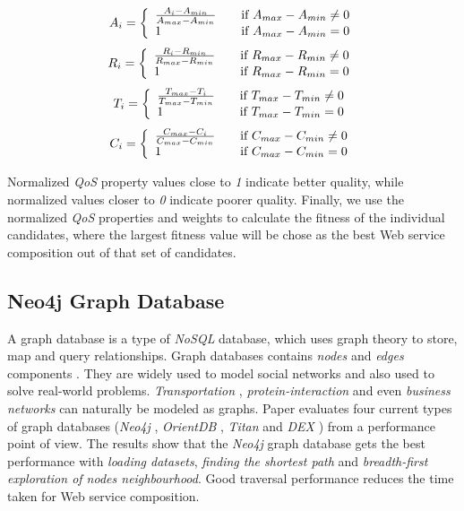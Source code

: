 \[A_i = \left\{
\begin{array}{l l} 
    \frac{A_i - A_{min}}{A_{max} - A_{min}}      & \quad \text{if  } A_{max} - A_{min} \neq 0\\
    1  & \quad \text{if  } A_{max} - A_{min} = 0\\
\end{array} \right. \]\label{eq:2}
\[R_i = \left\{
\begin{array}{l l} 
    \frac{R_i - R_{min}}{R_{max} - R_{min}}      & \quad \text{if  } R_{max} - R_{min} \neq 0\\
    1  & \quad \text{if  } R_{max} - R_{min} = 0\\
\end{array} \right. \]\label{eq:2}
\[T_i = \left\{
\begin{array}{l l} 
    \frac{T_{max} - T_i}{T_{max} - T_{min}}      & \quad \text{if  } T_{max} - T_{min} \neq 0\\
    1  & \quad \text{if  } T_{max} - T_{min} = 0\\
\end{array} \right. \]\label{eq:2}
\[C_i = \left\{
\begin{array}{l l} 
    \frac{C_{max} - C_i}{C_{max} - C_{min}}      & \quad \text{if  } C_{max} - C_{min} \neq 0\\
    1  & \quad \text{if  } C_{max} - C_{min} = 0\\
\end{array} \right. \]\label{eq:2}

Normalized \emph{QoS} property values close to \emph{1} indicate better quality, while normalized values closer to \emph{0} indicate poorer quality. Finally, we use the normalized \emph{QoS} properties and weights to calculate the fitness of the individual candidates, where the largest fitness value will be chose as the best Web service composition out of that set of candidates. 

\subsection{Neo4j Graph Database}
A graph database is a type of \emph{NoSQL} database, which uses graph theory to store, map and query relationships. Graph databases contains \emph{nodes} and \emph{edges} components \cite{30}. They are widely used to model social networks and also used to solve real-world problems. \emph{Transportation} \cite{32}, \emph{protein-interaction} \cite{33} and even \emph{business networks} \cite{34} can naturally be modeled as graphs. Paper \cite{30} evaluates four current types of graph databases (\emph{Neo4j} \cite{6}, \emph{OrientDB} \cite{35}, \emph{Titan} \cite{36} and \emph{DEX} \cite{37})  from a performance point of view. The results show that the \emph{Neo4j} graph database gets the best performance with \emph{loading datasets}, \emph{finding the shortest path} and \emph{breadth-first exploration of nodes neighbourhood}. Good traversal performance reduces the time taken for Web service composition. \par

